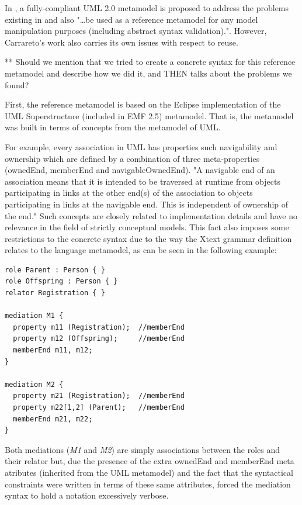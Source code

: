 \documentclass[
	10pt,				%
	oneside,
	a4paper,			%
	brazil,
	english
	]{abntex2}
\begin{document}
In \cite{carraretto10}, a fully-compliant UML 2.0 metamodel is proposed to
address the problems existing in \cite{benevides10} and also
"\ldots be used as a reference metamodel for any model manipulation purposes
(including abstract syntax validation).".
However, Carrareto's work also carries its own issues with respect to reuse.

** Should we mention that we tried to create a concrete syntax for this reference
metamodel and describe how we did it, and THEN talks about the problems we found?

First, the reference metamodel is based on the Eclipse implementation of the UML
Superstructure (included in EMF 2.5) metamodel. That is, the metamodel was built
in terms of concepts from the metamodel of UML.

For example, every association in UML has properties such navigability and ownership
which are defined by a combination of three meta-properties (ownedEnd, memberEnd
and navigableOwnedEnd).
%
"A navigable end of an association means that it is intended to be traversed at
runtime from objects participating in links at the other end(s) of the association
to objects participating in links at the navigable end.
This is independent of ownership of the end." \cite{UML20}
%
Such concepts are closely related to implementation details and have no relevance
in the field of strictly conceptual models.
%
This fact also imposes some restrictions to the concrete syntax due to the way
the Xtext grammar definition relates to the language metamodel, as can be seen in
the following example:

\begin{verbatim}
role Parent : Person { }
role Offspring : Person { }
relator Registration { }

mediation M1 {
  property m11 (Registration);  //memberEnd
  property m12 (Offspring);     //memberEnd
  memberEnd m11, m12;
}

mediation M2 {
  property m21 (Registration);  //memberEnd
  property m22[1,2] (Parent);   //memberEnd
  memberEnd m21, m22;
}
\end{verbatim}

Both mediations (\emph{M1} and \emph{M2}) are simply associations between the roles
and their relator but, due the presence of the extra ownedEnd and memberEnd meta
atributes (inherited from the UML metamodel) and the fact that the syntactical
constraints were written in terms of these same attributes, forced the mediation
syntax to hold a notation excessively verbose.
%
%
\end{document}
